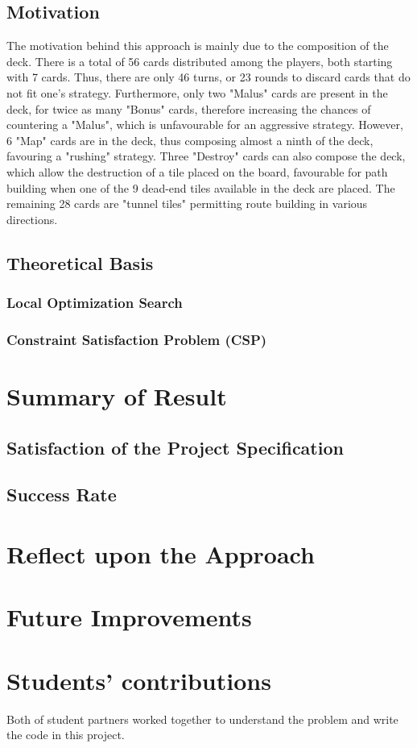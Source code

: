 \documentclass[12pt,twoside,letterpaper]{article}
\begin{document}
\subsection{Motivation}
The motivation behind this approach is mainly due to the composition of the deck. There is a total of 56 cards distributed among the players, both starting with 7 cards. Thus, there are only 46 turns, or 23 rounds to discard cards that do not fit one's strategy. Furthermore, only two "Malus" cards are present in the deck, for twice as many "Bonus" cards, therefore increasing the chances of countering a "Malus", which is unfavourable for an aggressive strategy. However, 6 "Map" cards are in the deck, thus composing almost a ninth of the deck, favouring a "rushing" strategy. Three "Destroy" cards can also compose the deck, which allow the destruction of a tile placed on the board, favourable for path building when one of the 9 dead-end tiles available in the deck are placed. The remaining 28 cards are "tunnel tiles" permitting route building in various directions.
\subsection{Theoretical Basis}
\subsubsection{Local Optimization Search}
\subsubsection{Constraint Satisfaction Problem (CSP)}
\clearpage

\section{Summary of Result}
\subsection{Satisfaction of the Project Specification}
\subsection{Success Rate}
\clearpage

\section{Reflect upon the Approach}
\lipsum
\clearpage

\section{Future Improvements}
\lipsum
\vfill
\section*{Students' contributions}
Both of student partners worked together to understand the problem and write the code in this project.
\end{document}
